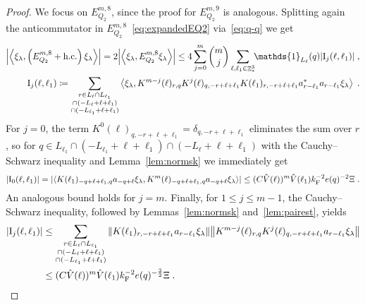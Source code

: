 \documentclass[12pt,a4paper]{article}
\numberwithin{equation}{section}
\newcommand{\1}{\mathbb{I}}
\newcommand{\F}{\mathrm{F}}
\newcommand{\I}{\mathrm{I}}
\DeclareMathOperator{\Z}{\mathbb{Z}}
\newcommand{\eva}[1]{\left\langle #1 \right\rangle}
\theoremstyle{plain}
\theoremstyle{definition}
\theoremstyle{remark}
\theoremstyle{plain}
\theoremstyle{definition}
\theoremstyle{remark}
\begin{document}
\begin{proof}
We focus on $ E^{m,8}_{Q_2} $, since the proof for $ E^{m,9}_{Q_2} $ is analogous.
Splitting again the anticommutator in $ E^{m,8}_{Q_2} $~\eqref{eq:expandedEQ2} via~\eqref{eq:q-q} we get
\begin{equation} \label{eq:EQ2181}
\begin{aligned}
	\abs{\eva{\xi_\lambda,\left(E^{m,8}_{Q_2}+\mathrm{h.c.}\right) \xi_\lambda }} 
	= 2\abs{\eva{\xi_\lambda, E^{m,8}_{Q_2} \xi_\lambda }}
	\le 4 \sum_{j=0}^m {{m}\choose j} \sum\limits_{\ell,\ell_1 \in \Z^3_*}\!\! \mathds{1}_{L_\ell}(q) |\I_j(\ell, \ell_1)| \;,\\
	\I_j(\ell, \ell_1)
	\coloneq \sum\limits_{\substack{r\in L_{\ell} \cap L_{\ell_1}\\\cap (-L_{\ell}+\ell+\ell_1) \\ \cap (-L_{\ell_1}+\ell+\ell_1)}}
		\eva{\xi_\lambda, K^{m-j}(\ell)_{r,q} K^{j}(\ell)_{q,-r+\ell+\ell_1} K(\ell_1)_{r,-r+\ell+\ell_1} a^*_{r-\ell_1} a_{r-\ell_1} \xi_\lambda} \;. \\
\end{aligned}
\end{equation}
For $ j = 0 $, the term $ K^0(\ell)_{q,-r+\ell+\ell_1} = \delta_{q,-r+\ell+\ell_1} $ eliminates the sum over $ r $, so for $ q \in L_{\ell_1} \cap (-L_{\ell_1} + \ell + \ell_1) \cap (-L_\ell + \ell + \ell_1) $ with the Cauchy--Schwarz inequality and Lemma~\ref{lem:normsk} we immediately get
\begin{equation}
	|\I_0(\ell, \ell_1)|
	= \abs{\eva{ K(\ell_1)_{-q+\ell+\ell_1,q} a_{-q+\ell} \xi_\lambda, K^m(\ell)_{-q+\ell+\ell_1,q} a_{-q+\ell} \xi_\lambda }}
	\leq (C \hat{V}(\ell))^m
		\hat{V}(\ell_1)
		k_{\F}^{-2} e(q)^{-2} \Xi \;. \label{eq:estEQ2181}
\end{equation}
An analogous bound holds for $ j = m $. Finally, for $ 1 \le j \le m-1 $, the Cauchy--Schwarz inequality, followed by Lemmas~\ref{lem:normsk} and~\ref{lem:pairest}, yields
\begin{align}
	|\I_j(\ell, \ell_1)|
	&\leq \sum\limits_{\substack{r\in L_{\ell} \cap L_{\ell_1}\\\cap (-L_{\ell}+\ell+\ell_1) \\ \cap (-L_{\ell_1}+\ell+\ell_1)}} \norm{ K(\ell_1)_{r,-r+\ell+\ell_1} a_{r-\ell_1} \xi_\lambda} \norm{ K^{m-j}(\ell)_{r,q} K^j(\ell)_{q,-r+\ell+\ell_1} a_{r-\ell_1} \xi_\lambda} \nonumber\\
	&\leq (C \hat{V}(\ell))^m
		\hat{V}(\ell_1)
		k_{\F}^{-2} e(q)^{-\frac 32} \Xi \;. \label{eq:estEQ2182}
\end{align}
\end{proof}
\end{document}
